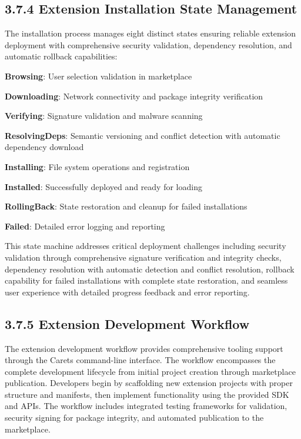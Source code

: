 \subsection*{3.7.4 Extension Installation State Management}

The installation process manages eight distinct states ensuring reliable extension deployment with comprehensive security validation, dependency resolution, and automatic rollback capabilities:

\begin{compactlist}
    \item \textbf{Browsing}: User selection validation in marketplace
    \item \textbf{Downloading}: Network connectivity and package integrity verification
    \item \textbf{Verifying}: Signature validation and malware scanning
    \item \textbf{ResolvingDeps}: Semantic versioning and conflict detection with automatic dependency download
    \item \textbf{Installing}: File system operations and registration
    \item \textbf{Installed}: Successfully deployed and ready for loading
    \item \textbf{RollingBack}: State restoration and cleanup for failed installations
    \item \textbf{Failed}: Detailed error logging and reporting
\end{compactlist}

This state machine addresses critical deployment challenges including security validation through comprehensive signature verification and integrity checks, dependency resolution with automatic detection and conflict resolution, rollback capability for failed installations with complete state restoration, and seamless user experience with detailed progress feedback and error reporting.

\subsection*{3.7.5 Extension Development Workflow}

The extension development workflow provides comprehensive tooling support through the Carets command-line interface. The workflow encompasses the complete development lifecycle from initial project creation through marketplace publication. Developers begin by scaffolding new extension projects with proper structure and manifests, then implement functionality using the provided SDK and APIs. The workflow includes integrated testing frameworks for validation, security signing for package integrity, and automated publication to the marketplace.

